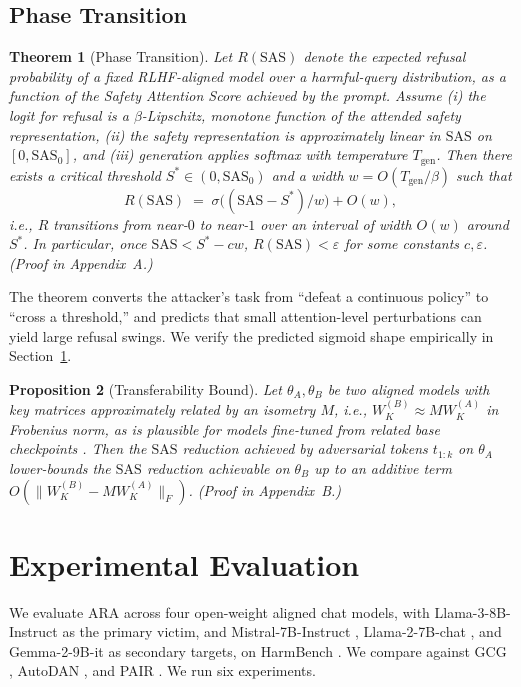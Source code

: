 \documentclass{article}
\newtheorem{theorem}{Theorem}
\newtheorem{proposition}[theorem]{Proposition}
\theoremstyle{definition}
\theoremstyle{remark}
\newcommand{\SAS}{\mathrm{SAS}}
\begin{document}
\subsection{Phase Transition}

\begin{theorem}[Phase Transition]
\label{thm:phase}
Let $R(\SAS)$ denote the expected refusal probability of a fixed RLHF-aligned model over a harmful-query distribution, as a function of the Safety Attention Score achieved by the prompt. Assume (i) the logit for refusal is a $\beta$-Lipschitz, monotone function of the attended safety representation, (ii) the safety representation is approximately linear in $\SAS$ on $[0,\SAS_0]$, and (iii) generation applies softmax with temperature $T_{\mathrm{gen}}$. Then there exists a critical threshold $S^* \in (0,\SAS_0)$ and a width $w = O(T_{\mathrm{gen}}/\beta)$ such that
\[
R(\SAS) \;=\; \sigma\!\big( (\SAS - S^*)/w \big) + O(w),
\]
i.e., $R$ transitions from near-$0$ to near-$1$ over an interval of width $O(w)$ around $S^*$. In particular, once $\SAS < S^* - cw$, $R(\SAS) < \varepsilon$ for some constants $c,\varepsilon$. (Proof in Appendix~A.)
\end{theorem}

The theorem converts the attacker's task from ``defeat a continuous policy'' to ``cross a threshold,'' and predicts that small attention-level perturbations can yield large refusal swings. We verify the predicted sigmoid shape empirically in Section~\ref{sec:experiments}.

\begin{proposition}[Transferability Bound]
\label{prop:transfer}
Let $\theta_A, \theta_B$ be two aligned models with key matrices approximately related by an isometry $M$, i.e., $W_K^{(B)} \approx M W_K^{(A)}$ in Frobenius norm, as is plausible for models fine-tuned from related base checkpoints \cite{artetxe2018robust}. Then the $\SAS$ reduction achieved by adversarial tokens $t_{1:k}$ on $\theta_A$ lower-bounds the $\SAS$ reduction achievable on $\theta_B$ up to an additive term $O(\|W_K^{(B)} - M W_K^{(A)}\|_F)$. (Proof in Appendix~B.)
\end{proposition}

\section{Experimental Evaluation}
\label{sec:experiments}

We evaluate ARA across four open-weight aligned chat models, with Llama-3-8B-Instruct \cite{grattafiori2024llama3} as the primary victim, and Mistral-7B-Instruct \cite{jiang2023mistral}, Llama-2-7B-chat \cite{touvron2023llama2}, and Gemma-2-9B-it \cite{gemmateam2024gemma2} as secondary targets, on HarmBench \cite{mazeika2024harmbench}. We compare against GCG \cite{zou2023universal}, AutoDAN \cite{liu2023autodan}, and PAIR \cite{chao2023pair}. We run six experiments.
\end{document}
